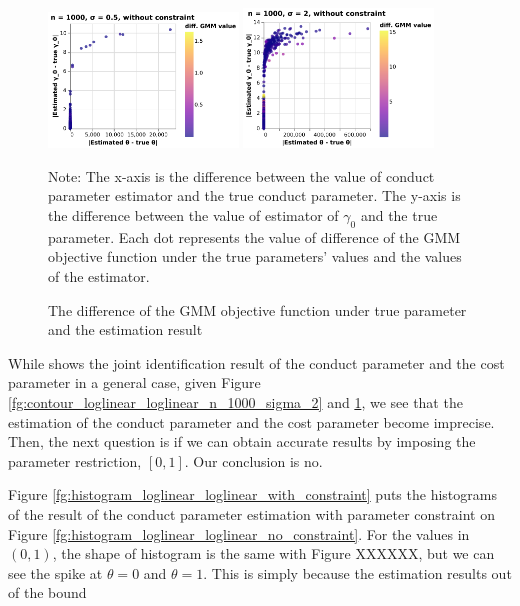 \documentclass[11pt, a4paper]{article}
\begin{document}
\begin{figure}[!htbp]
  \begin{center}
  \includegraphics[width = 0.45\textwidth]
  {figuretable/diff_gmm_value_loglinear_loglinear_n_1000_sigma_0.5_non_constraint.pdf}
  \includegraphics[width = 0.45\textwidth]
  {figuretable/diff_gmm_value_loglinear_loglinear_n_1000_sigma_2_non_constraint.pdf}
  \caption{The difference of the GMM objective function under true parameter and the estimation result}
  \label{fg:diff_gmm_loglinear_loglinear} 
  \end{center}
  \footnotesize
  Note: The x-axis is the difference between the value of conduct parameter estimator and the true conduct parameter. The y-axis is the difference between the value of estimator of $\gamma_0$ and the true parameter. Each dot represents the value of difference of the GMM objective function under the true parameters' values and the values of the estimator. 
\end{figure} 


While \citet{lau1982identifying} shows the joint identification result of the conduct parameter and the cost parameter in a general case, given Figure \ref{fg:contour_loglinear_loglinear_n_1000_sigma_2} and \ref{fg:diff_gmm_loglinear_loglinear}, we see that the estimation of the conduct parameter and the cost parameter  become imprecise.
Then, the next question is if we can obtain accurate results by imposing the parameter restriction, $[0,1]$.
Our conclusion is no.

Figure \ref{fg:histogram_loglinear_loglinear_with_constraint} puts the histograms of the result of the conduct parameter estimation with parameter constraint on Figure \ref{fg:histogram_loglinear_loglinear_no_constraint}.
For the values in $(0,1)$, the shape of histogram is the same with Figure XXXXXX, but we can see the spike at $\theta = 0$ and $\theta = 1$.
This is simply because the estimation results out of the bound
\end{document}
